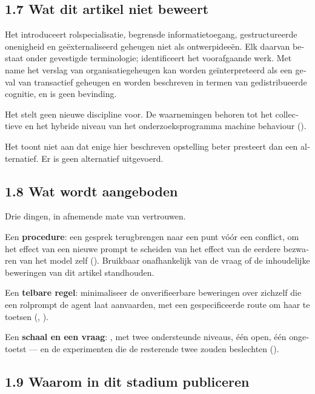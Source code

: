 \begin{dutch}
\subsection*{1.7 Wat dit artikel niet beweert}
\label{sec:nl:1.7}

Het introduceert rolspecialisatie, begrensde informatietoegang, gestructureerde onenigheid en geëxternaliseerd geheugen niet als ontwerpideeën. Elk daarvan bestaat onder gevestigde terminologie;  identificeert het voorafgaande werk. Met name het verslag van organisatiegeheugen kan worden geïnterpreteerd als een geval van transactief geheugen en worden beschreven in termen van gedistribueerde cognitie, en is geen bevinding.

Het stelt geen nieuwe discipline voor. De waarnemingen behoren tot het collectieve en het hybride niveau van het onderzoeksprogramma machine behaviour ().

Het toont niet aan dat enige hier beschreven opstelling beter presteert dan een alternatief. Er is geen alternatief uitgevoerd.


\subsection*{1.8 Wat wordt aangeboden}
\label{sec:nl:1.8}

Drie dingen, in afnemende mate van vertrouwen.

Een \textbf{procedure}: een gesprek terugbrengen naar een punt vóór een conflict, om het effect van een nieuwe prompt te scheiden van het effect van de eerdere bezwaren van het model zelf (). Bruikbaar onafhankelijk van de vraag of de inhoudelijke beweringen van dit artikel standhouden.

Een \textbf{telbare regel}: minimaliseer de onverifieerbare beweringen over zichzelf die een rolprompt de agent laat aanvaarden, met een gespecificeerde route om haar te toetsen (, ).

Een \textbf{schaal en een vraag}: , met twee ondersteunde niveaus, één open, één ongetoetst — en de experimenten die de resterende twee zouden beslechten ().


\subsection*{1.9 Waarom in dit stadium publiceren}
\label{sec:nl:1.9}


\end{dutch}

